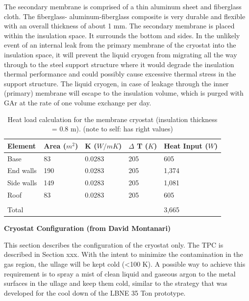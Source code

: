 The secondary membrane is comprised of a thin aluminum sheet and fiberglass cloth. The fiberglass-
aluminum-fiberglass composite is very durable and flexible with an overall thickness of about 1 mm. The 
secondary membrane is placed within the insulation space. It surrounds the bottom and sides. In the 
unlikely event of an internal leak from the primary membrane of the cryostat into the insulation space, it 
will prevent the liquid cryogen from migrating all the way through to the steel support structure where it 
would degrade the insulation thermal performance and could possibly cause excessive thermal stress in 
the support structure. The liquid cryogen, in case of leakage through the inner (primary) membrane will 
escape to the insulation volume, which is purged with GAr at the rate of one volume exchange per day.

\begin{table}[htpb]
\caption{Heat load calculation for the membrane cryostat (insulation thickness = 0.8 m). (note to self: has right values)}
\label{tbl:heat-load-calc}
\centering
\begin{tabular}{|p{}|p{}|p{}|p{}|p{}|}
\hline
 \textbf{Element} & \textbf{Area ($m^2$)}  &  \textbf{K ($W/mK$)} & \textbf{$\Delta$ T ($K$)}
 & \textbf{Heat Input ($W$)}\\ \hline
Base   & 83  & 0.0283   &205   & 605 \\ \hline
 End walls  &  190 & 0.0283  &  205 &  1,374\\ \hline
Side walls   & 149  & 0.0283  &  205 & 1,081 \\ \hline
 Roof  &  83 & 0.0283  & 205  &  605\\ \hline
   &   &   &   &  \\ \hline
Total   &   &   &   & 3,665 \\ \hline
\end{tabular}
\end{table}

\textbf{Cryostat Configuration (from David Montanari)}

This section describes the configuration of the cryostat only. The TPC is described in Section xxx. With the intent to minimize the contamination in the gas region, the ullage will be kept cold (\textless 100 K). A possible way to achieve this requirement is to spray a mist of clean liquid and gaseous argon to the metal surfaces in the ullage and keep them cold, similar to the strategy that was developed for the cool down of the LBNE 35 Ton prototype.

